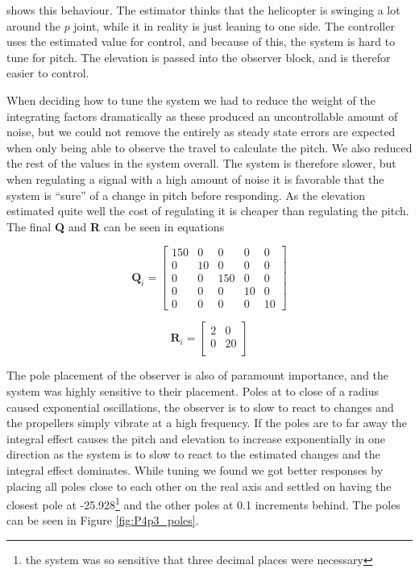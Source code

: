  shows this behaviour. The estimator thinks that the helicopter is swinging a lot around the $p$ joint, while it in reality is just leaning to one side. The controller uses the estimated value for control, and because of this, the system is hard to tune for pitch. The elevation is passed into the observer block, and is therefor easier to control.

When deciding how to tune the system we had to reduce the weight of the integrating factors dramatically as these produced an uncontrollable amount of noise, but we could not remove the entirely as steady state errors are expected when only being able to observe the travel to calculate the pitch. We also reduced the rest of the values in the system overall. The system is therefore slower, but when regulating a signal with a high amount of noise it is favorable that the system is ``sure'' of a change in pitch before responding. As the elevation estimated quite well the cost of regulating it is cheaper than regulating the pitch. The final \textbf{Q} and \textbf{R} can be seen in equations


\begin{equation} \label{eq:Q_P4p3}
    \bm{Q}_i = 
	\begin{bmatrix}
		150 &  0    &  0      &  0   &  0 \\
		0     &  10   &  0      &  0   &  0 \\
		0     &  0    &  150  &  0   &  0 \\
		0     &  0    &  0      &  10 &  0 \\
		0     &  0    &  0      &  0   &  10
	\end{bmatrix}
\end{equation} 

\begin{equation} \label{eq:R_P4p3}
    \bm{R}_i = 
	\begin{bmatrix}
		2   & 0  \\
		0    & 20\\

	\end{bmatrix}
\end{equation} 

The pole placement of the observer is also of paramount importance, and the system was highly sensitive to their placement. Poles at to close of a radius caused exponential oscillations, the observer is to slow to react to changes and the propellers simply vibrate at a high frequency. If the poles are to far away the integral effect causes the pitch and elevation to increase exponentially in one direction as the system is to slow to react to the estimated changes and the integral effect dominates. While tuning we found we got better responses by placing all poles close to each other on the real axis and settled on having the closest pole at -25.928\footnote{the system was so sensitive that three decimal places were necessary} and the other poles at 0.1 increments behind. The poles can be seen in Figure \ref{fig:P4p3_poles}.

